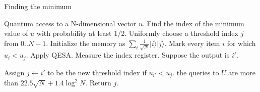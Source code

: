 \documentclass{article}
\begin{document}
\pagestyle{empty} 

\begin{algorithm}[ht]
	\caption{Finding the minimum}
	\label{FindingMin}
	\begin{algorithmic}[1]

		\Require Quantum access to a N-dimensional vector $u$.
		\Ensure Find the index of the minimum value of $u$ with probability at least $1/2$.
		\vspace{10pt}
		\State Uniformly choose a threshold index $j$ from $0..N-1$.
		\Repeat
		\State Initialize the memory as $\sum_{i} \frac{1}{\sqrt{N}}|i\rangle|j\rangle$.
		Mark every item $i$ for which $u_i < u_j$.
		\State Apply QESA.
		\State Measure the index register. Suppose the output is $i'$.

		Assign $j \leftarrow i'$ to be the new threshold index if $u_{i'} < u_j$.
		\Until the queries to $U$ are more than $22.5\sqrt{N} + 1.4\log^2{N}$.
		\State Return $j$.
	\end{algorithmic}
\end{algorithm}
\end{document}
